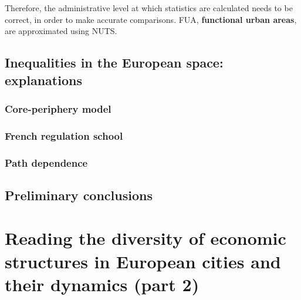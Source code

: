 \documentclass{article}
\begin{document}
Therefore, the administrative level at which statistics are calculated needs to be correct, in order to make accurate comparisons. 
FUA, \textbf{functional urban areas}, are approximated using NUTS. 

\subsection{Inequalities in the European space: explanations}

\begin{outline}
	\1
\end{outline}


\subsubsection{Core-periphery model}


\begin{outline}
	\1
\end{outline}

\subsubsection{French regulation school}


\begin{outline}
	\1
\end{outline}

\subsubsection{Path dependence}


\begin{outline}
	\1
\end{outline}

\subsection{Preliminary conclusions}





\section{Reading the diversity of economic structures in European cities and their dynamics (part 2)}
\date{October 25th, 2021}
\end{document}
